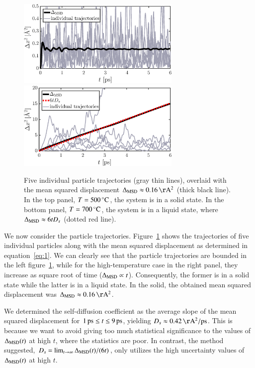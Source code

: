 \begin{figure}[!ht]
\begin{center}
  \includegraphics[width=0.7\textwidth]{../figures/MSD-500}  \\
    \includegraphics[width=0.7\textwidth]{../figures/MSD-700} 
  \caption{Five individual particle trajectories (gray thin lines), overlaid with the mean squared displacement $\Delta_{\rm MSD} \approx \unit[0.16]{\AA^2}$ (thick black line). In the top panel, $T=\unit[500]{^\circ C}$, the system is in a solid state. In the bottom panel, $T=\unit[700]{^\circ C}$, the system is in a liquid state, where $\Delta_{\rm MSD} \approx 6 t D_s$ (dotted red line).}
  \label{fig:MSD}
\end{center}
\end{figure}
We now consider the particle trajectories. Figure~\ref{fig:MSD} shows the trajectories of five individual particles along with the mean squared displacement as determined in equation~\eqref{eq:1}. We can clearly see that the particle trajectories are bounded in the left figure~\ref{fig:MSD}, while for the high-temperature case in the right panel, they increase as square root of time ($\Delta_{\rm MSD} \propto t$). Consequently, the former is in a solid state while the latter is in a liquid state.  
In the solid, the obtained mean squared displacement was $\Delta_{\rm MSD} \approx \unit[0.16]{\AA^2}$.

We determined the self-diffusion coefficient as the average slope of the mean squared displacement for $\unit[1]{ps} \leq t \leq \unit[9]{ps}$, yielding $D_s \approx \unit[0.42]{\AA^2/ps}$. This is because we want to avoid giving too much statistical significance to the values of $\Delta_{\rm MSD}(t)$ at high $t$, where the statistics are poor. 
In contrast, the method suggested, $D_s=\lim_{t\to\infty}\Delta_{\rm MSD}(t)/(6t)$, only utilizes the high uncertainty values of $\Delta_{\rm MSD}(t)$ at high $t$.




